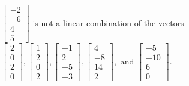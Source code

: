 \begin{exercise}
\begin{exerciseStatement}
  \end{exerciseStatement}
  \begin{exerciseAnswer}
   \(\left[\begin{array}{c}
-2 \\
-6 \\
4 \\
5
\end{array}\right]\) 
  	 is not  
	a linear combination of the vectors \(\left[\begin{array}{c}
2 \\
0 \\
2 \\
0
\end{array}\right] , \left[\begin{array}{c}
1 \\
2 \\
0 \\
2
\end{array}\right] , \left[\begin{array}{c}
-1 \\
2 \\
-5 \\
-3
\end{array}\right] , \left[\begin{array}{c}
4 \\
-8 \\
14 \\
2
\end{array}\right] , \text{ and } \left[\begin{array}{c}
-5 \\
-10 \\
6 \\
0
\end{array}\right]\).

	
  


  \end{exerciseAnswer}
\end{exercise}